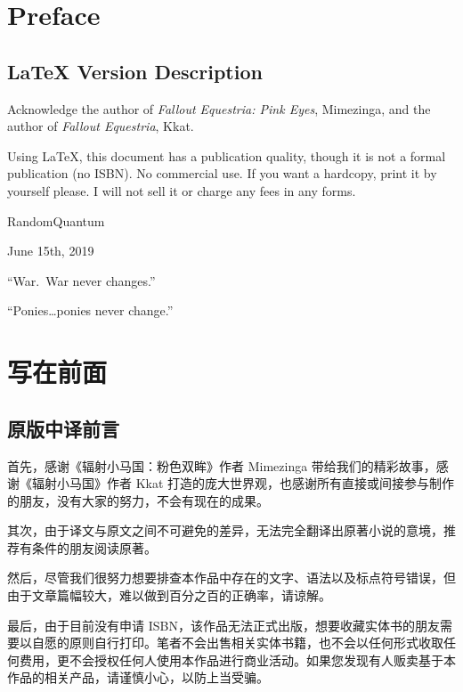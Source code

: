 \chapter{Preface}

\section*{\LaTeX{} Version Description}

Acknowledge the author of \emph{Fallout Equestria: Pink Eyes}, Mimezinga, and the author of \emph{Fallout Equestria}, Kkat.

Using \LaTeX{}, this document has a publication quality, though it is not a formal publication (no ISBN). No commercial use. If you want a hardcopy, print it by yourself please. I will not sell it or charge any fees in any forms.

\begin{flushright}
RandomQuantum

June 15th, 2019
\end{flushright}

\clearpage

\begin{motto}
``War. War never changes.''

\medskip

``Ponies\dots ponies never change.''
\end{motto}

\chapter{写在前面}

\section*{原版中译前言}

首先，感谢《辐射小马国：粉色双眸》作者 Mimezinga 带给我们的精彩故事，感谢《辐射小马国》作者 Kkat 打造的庞大世界观，也感谢所有直接或间接参与制作的朋友，没有大家的努力，不会有现在的成果。

其次，由于译文与原文之间不可避免的差异，无法完全翻译出原著小说的意境，推荐有条件的朋友阅读原著。

然后，尽管我们很努力想要排查本作品中存在的文字、语法以及标点符号错误，但由于文章篇幅较大，难以做到百分之百的正确率，请谅解。

最后，由于目前没有申请 ISBN，该作品无法正式出版，想要收藏实体书的朋友需要以自愿的原则自行打印。笔者不会出售相关实体书籍，也不会以任何形式收取任何费用，更不会授权任何人使用本作品进行商业活动。如果您发现有人贩卖基于本作品的相关产品，请谨慎小心，以防上当受骗。

